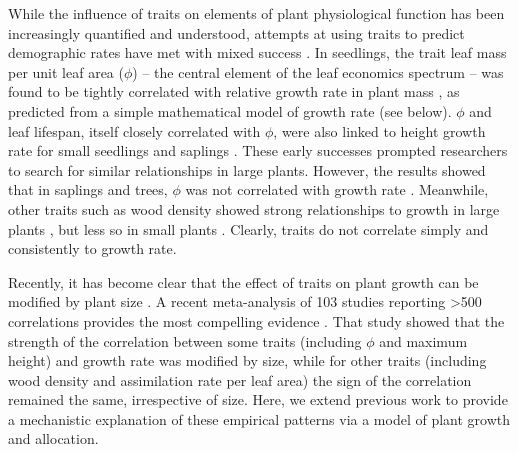 \documentclass[9pt,twocolumn,twoside,lineno]{pnas-new}
\begin{document}
While the influence of traits on elements of plant physiological function has been increasingly quantified and understood, attempts at using traits to predict demographic rates have met with mixed success \citep{Poorter-2006, Poorter-2008,Wright-2010,Herault-2011,Paine-2015}. In seedlings, the trait leaf mass per unit leaf area ($\phi$) -- the central element of the leaf economics spectrum \citep{Wright-2004} -- was found to be tightly correlated with relative growth rate in plant mass \citep{Lambers-1992, Cornelissen-1996, Wright-2000}, as predicted from a simple mathematical model of growth rate (see below). $\phi$ and leaf lifespan, itself closely correlated with $\phi$, were also linked to height growth rate for small seedlings and saplings \citep{Reich-1992, Poorter-2006}. These early successes prompted researchers to search for similar relationships in large plants. However, the results showed that in saplings and trees, $\phi$ was not correlated with growth rate \citep{Poorter-2008, Wright-2010, Herault-2011, Paine-2015}. Meanwhile, other traits such as wood density showed strong relationships to growth in large plants \citep{Wright-2010,Herault-2011}, but less so in small plants \citep{Castro-1998}. Clearly, traits do not correlate simply and consistently to growth rate.

Recently, it has become clear that the effect of traits on plant growth can be modified by plant size \citep{Falster-2011, Ruger-2012, Iida-2014, Visser-2016, Gibert-2016}. A recent meta-analysis of 103 studies reporting \textgreater 500 correlations provides the most compelling evidence \citep{Gibert-2016}. That study showed that the strength of the correlation between some traits (including $\phi$ and maximum height) and growth rate was modified by size, while for other traits (including wood density and assimilation rate per leaf area) the sign of the correlation remained the same, irrespective of size. Here, we extend previous work \citep{Gibert-2016} to provide a mechanistic explanation of these empirical patterns via a model of plant growth and allocation.
\end{document}
